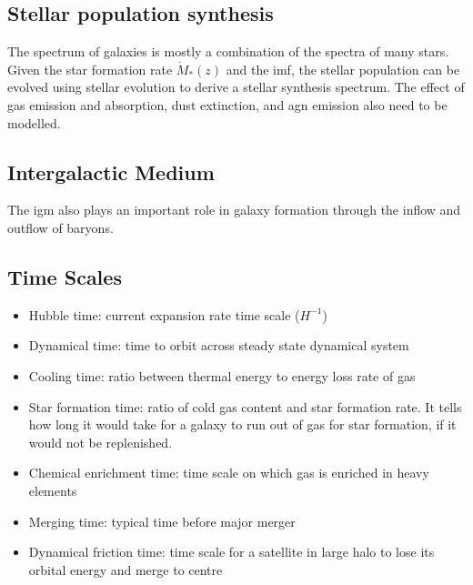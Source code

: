 \subsection{Stellar population synthesis}
The spectrum of galaxies is mostly a combination of the spectra of many stars. Given the star formation rate $\dot{M}_{*}(z)$ and the \ac{imf}, the stellar population can be evolved using stellar evolution to derive a stellar synthesis spectrum. The effect of gas emission and absorption, dust extinction, and \ac{agn} emission also need to be modelled.


\subsection{Intergalactic Medium}

The \ac{igm} also plays an important role in galaxy formation through the inflow and outflow of baryons.




\subsection{Time Scales}
\begin{itemize}
	\item Hubble time: current expansion rate time scale ($H^{-1}$)
	\item Dynamical time: time to orbit across steady state dynamical system
	\item Cooling time: ratio between thermal energy to energy loss rate of gas
	\item Star formation time: ratio of cold gas content and star formation rate. It tells how long it would take for a galaxy to run out of gas for star formation, if it would not be replenished.
	\item Chemical enrichment time: time scale on which gas is enriched in heavy elements
	\item Merging time: typical time before major merger
	\item Dynamical friction time: time scale for a satellite in large halo to lose its orbital energy and merge to centre
\end{itemize}



